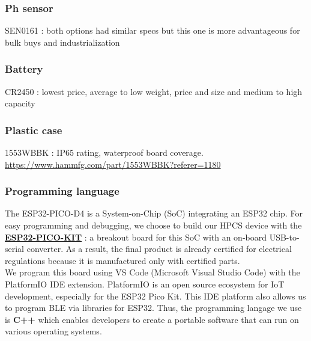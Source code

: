 \subsubsection{Ph sensor}
SEN0161 : both options had similar specs but this one is more advantageous for bulk buys and industrialization
\subsubsection{Battery}
CR2450 : lowest price, average to low weight, price and size and medium to high capacity
\subsubsection{Plastic case}
1553WBBK : IP65 rating, waterproof board coverage.
\url{https://www.hammfg.com/part/1553WBBK?referer=1180}\\

\subsubsection*{Programming language}
The ESP32-PICO-D4 is a System-on-Chip (SoC) integrating an ESP32 chip.
For easy programming and debugging, we choose to build our HPCS device with the \textbf{\href{https://www.elektor.com/esp32-pico-kit-v4}{ESP32-PICO-KIT}} : a breakout board for this SoC with an on-board USB-to-serial converter. As a result, the final product is already certified for electrical regulations because it is manufactured only with certified parts.\\
We program this board using VS Code (Microsoft Visual Studio Code) with the PlatformIO IDE extension.
PlatformIO is an open source ecosystem for IoT development, especially for the ESP32 Pico Kit\cite{b8}. This IDE platform also allows us to program BLE via libraries for ESP32. 
Thus, the programming langage we use is \textbf{C++} which enables developers to create a portable software that can run on various operating systems.

